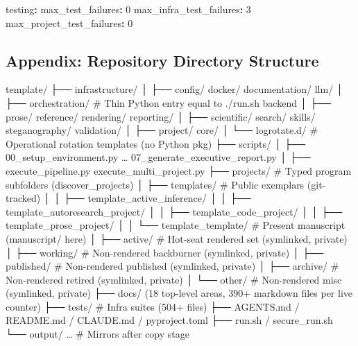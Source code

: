 \documentclass[
  english,
]{article}
\newenvironment{Shaded}{}{}
\newcommand{\AttributeTok}[1]{\textcolor[rgb]{0.49,0.56,0.16}{#1}}
\newcommand{\DecValTok}[1]{\textcolor[rgb]{0.25,0.63,0.44}{#1}}
\newcommand{\FunctionTok}[1]{\textcolor[rgb]{0.02,0.16,0.49}{#1}}
\newcommand{\KeywordTok}[1]{\textcolor[rgb]{0.00,0.44,0.13}{\textbf{#1}}}
\newcommand{\NormalTok}[1]{#1}
\begin{document}
\begin{Shaded}
\begin{Highlighting}[]
\FunctionTok{testing}\KeywordTok{:}
\AttributeTok{  }\FunctionTok{max\_test\_failures}\KeywordTok{:}\AttributeTok{ }\DecValTok{0}
\AttributeTok{  }\FunctionTok{max\_infra\_test\_failures}\KeywordTok{:}\AttributeTok{ }\DecValTok{3}
\AttributeTok{  }\FunctionTok{max\_project\_test\_failures}\KeywordTok{:}\AttributeTok{ }\DecValTok{0}
\end{Highlighting}
\end{Shaded}

\newpage

\newpage

\subsection{Appendix: Repository Directory
Structure}\label{appendix-directory}

\begin{Shaded}
\begin{Highlighting}[]
\NormalTok{template/}
\NormalTok{├── infrastructure/}
\NormalTok{│   ├── config/ docker/ documentation/ llm/}
\NormalTok{│   ├── orchestration/   \# Thin Python entry equal to \textasciigrave{}./run.sh\textasciigrave{} backend}
\NormalTok{│   ├── prose/ reference/ rendering/ reporting/}
\NormalTok{│   ├── scientific/ search/ skills/ steganography/ validation/}
\NormalTok{│   ├── project/ core/}
\NormalTok{│   └── logrotate.d/      \# Operational rotation templates (no Python pkg)}
\NormalTok{├── scripts/}
\NormalTok{│   ├── 00\_setup\_environment.py … 07\_generate\_executive\_report.py}
\NormalTok{│   ├── execute\_pipeline.py execute\_multi\_project.py}
\NormalTok{├── projects/                    \# Typed program subfolders (\textasciigrave{}discover\_projects\textasciigrave{})}
\NormalTok{│   ├── templates/               \# Public exemplars (git{-}tracked)}
\NormalTok{│   │   ├── template\_active\_inference/}
\NormalTok{│   │   ├── template\_autoresearch\_project/}
\NormalTok{│   │   ├── template\_code\_project/}
\NormalTok{│   │   ├── template\_prose\_project/}
\NormalTok{│   │   └── template\_template/   \# Present manuscript (\textasciigrave{}manuscript/\textasciigrave{} here)}
\NormalTok{│   ├── active/                  \# Hot{-}seat rendered set (symlinked, private)}
\NormalTok{│   ├── working/                 \# Non{-}rendered backburner (symlinked, private)}
\NormalTok{│   ├── published/               \# Non{-}rendered published (symlinked, private)}
\NormalTok{│   ├── archive/                 \# Non{-}rendered retired (symlinked, private)}
\NormalTok{│   └── other/                   \# Non{-}rendered misc (symlinked, private)}
\NormalTok{├── docs/ (18 top{-}level areas, 390+ markdown files per live counter)}
\NormalTok{├── tests/                       \# Infra suites (504+ files)}
\NormalTok{├── AGENTS.md / README.md / CLAUDE.md / pyproject.toml}
\NormalTok{├── run.sh / secure\_run.sh}
\NormalTok{└── output/ …                    \# Mirrors after copy stage}
\end{Highlighting}
\end{Shaded}
\end{document}
